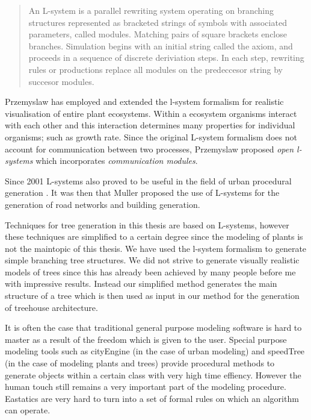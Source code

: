 \documentclass{article}
\begin{document}
\begin{quote}
An L-system is a parallel rewriting system operating on branching structures represented as bracketed strings of symbols with associated parameters, called modules. Matching pairs of square brackets enclose branches. Simulation begins with an  initial string called the axiom, and proceeds in a sequence of discrete deriviation steps. In each step, rewriting rules or productions replace all modules on the predeccesor string by succesor modules.   
\end{quote}   

Przemyslaw \cite{PrzemyslawPlants} has employed and extended the l-system formalism for realistic visualisation of
entire plant ecosystems. Within a ecosystem organisms interact with each other and this interaction determines many 
properties for individual organisms; such as growth rate. Since the original L-system formalism does not account for communication between two processes, Przemyslaw proposed \emph{open l-systems} which incorporates \emph{communication modules}.    
  
Since 2001 L-systems also proved to be useful in the field of urban procedural generation \cite{Wonka03}. It was then that Muller proposed the use of L-systems for the generation of road networks and building generation. 


Techniques for tree generation in this thesis are based on L-systems, however these techniques are simplified to a certain degree since the modeling of plants is not the maintopic of this thesis. We have used the l-system formalism to generate simple branching tree structures. We did not strive to generate visually realistic models of trees since this has already been achieved by many people before me with impressive results. Instead our simplified method generates the main structure of a tree which is then used as input in our method for the generation of treehouse architecture. 


It is often the case that traditional general purpose modeling software is hard to master as a result of the freedom which is given to the user. Special purpose modeling tools such as cityEngine \cite{Muller06} (in the case of urban modeling) and speedTree (in the case of modeling plants and trees) provide procedural methods to generate objects within a certain class with very high time effiency. However the human touch still remains a very important part of the modeling procedure. Eastatics are very hard to turn into a set of formal rules on which an algorithm can operate.
\end{document}
